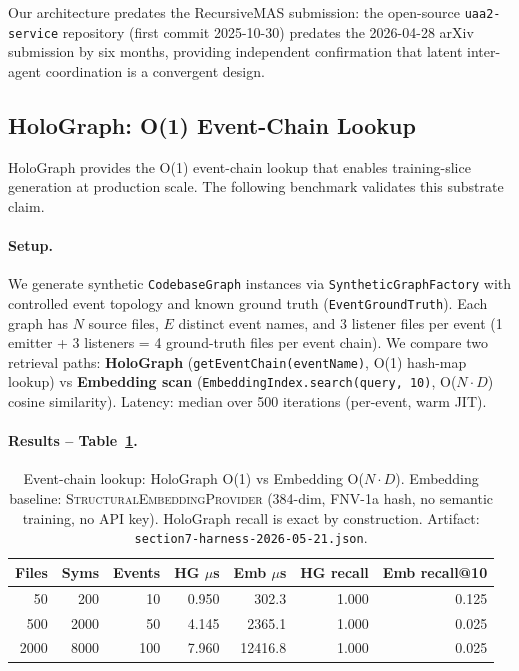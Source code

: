Our architecture predates the RecursiveMAS submission: the open-source
\texttt{uaa2-service} repository (first commit 2025-10-30) predates the
2026-04-28 arXiv submission by six months, providing independent confirmation
that latent inter-agent coordination is a convergent design.

\subsection{HoloGraph: O(1) Event-Chain Lookup}
\label{sec:eval-holograph}

HoloGraph provides the O(1) event-chain lookup that enables training-slice
generation at production scale.  The following benchmark validates this
substrate claim.

\paragraph{Setup.}
We generate synthetic \texttt{CodebaseGraph} instances via \texttt{SyntheticGraphFactory}
with controlled event topology and known ground truth (\texttt{EventGroundTruth}).
Each graph has $N$ source files, $E$ distinct event names, and 3 listener files
per event (1 emitter + 3 listeners = 4 ground-truth files per event chain).
We compare two retrieval paths: \textbf{HoloGraph}
(\texttt{getEventChain(eventName)}, O(1) hash-map lookup) vs
\textbf{Embedding scan} (\texttt{EmbeddingIndex.search(query,~10)},
O($N \cdot D$) cosine similarity).
Latency: median over 500 iterations (per-event, warm JIT).

\paragraph{Results -- Table~\ref{tab:holograph-lookup}.}

\begin{table}[h]
\centering
\caption{Event-chain lookup: HoloGraph O(1) vs Embedding O($N \cdot D$).
  Embedding baseline: \textsc{StructuralEmbeddingProvider} (384-dim, FNV-1a hash,
  no semantic training, no API key).  HoloGraph recall is exact by construction.
  Artifact: \texttt{section7-harness-2026-05-21.json}.}
\label{tab:holograph-lookup}
\begin{tabular}{rrrrrrr}
\toprule
Files & Syms & Events & HG $\mu$s & Emb $\mu$s & HG recall & Emb recall@10 \\
\midrule
   50 &  200 &     10 &  0.950 &   302.3 & 1.000 & 0.125 \\
  500 & 2000 &     50 &  4.145 &  2365.1 & 1.000 & 0.025 \\
 2000 & 8000 &    100 &  7.960 & 12416.8 & 1.000 & 0.025 \\
\bottomrule
\end{tabular}
\end{table}

